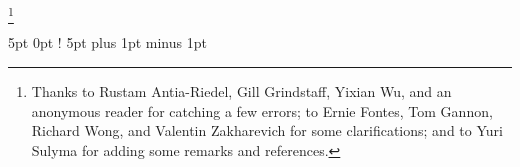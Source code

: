 
\author{Arun Debray}
\date{\today}
\thanks{Thanks to Rustam Antia-Riedel, Gill Grindstaff, Yixian Wu, and an anonymous reader for catching a few
errors; to Ernie Fontes, Tom Gannon, Richard Wong, and Valentin Zakharevich for some clarifications; and to Yuri
Sulyma for adding some remarks and references.}

\usepackage[charter]{mathdesign}
\usepackage[T1]{fontenc}

\renewcommand{\term}[1]{{\bfseries #1}}
\newcommand{\sSet}{\cat{sSet}}
\DeclareMathOperator{\Map}{Map}
\DeclareMathOperator{\rank}{rank\,}
\DeclareMathOperator{\Un}{Un}
\newcommand{\KU}{\mathit{KU}}

\newcommand{\LD}{\mathbf L}
\newcommand{\RD}{\mathbf R}

\DeclareMathOperator{\Lan}{Lan}
\DeclareMathOperator{\Ran}{Ran}

\newcommand{\matr}[4]{
  \begin{bmatrix} #1 & #2 \\ #3 & #4 \end{bmatrix}
}

\newcommand{\morph}{\mathop{\longrightarrow}\limits}
\newcommand{\twomorph}{\mathop{\Longrightarrow}\limits}

\newcommand{\dadjnctn}[6][2em]{
  \xymatrix@1@C=#1{
    #2 \ar@<2ex>[r]^-{#4} \ar@<-2ex>[r]_-{#6}
    \ar@{}@<1.2ex>[r]|-{\scriptscriptstyle\bot} \ar@{}@<-1.2ex>[r]|-{\scriptscriptstyle\bot}
    &
    #3 \ar[l]|-{#5}
  }
}

  {\topsep}   %
  {5pt}   %
  {\normalfont}  %
  {0pt}       %
  {\bfseries} %
  {!}         %
  {5pt plus 1pt minus 1pt} %
  {}          %
\theoremstyle{warning}
\newtheorem*{warn}{Warning}

